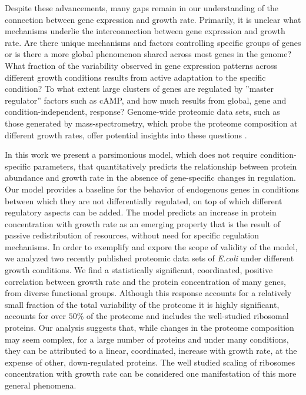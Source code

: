 \documentclass[a4paper]{article}
\begin{document}
Despite these advancements, many gaps remain in our understanding of the connection between gene expression and growth rate.
Primarily, it is unclear what mechanisms underlie the interconnection between gene expression and growth rate.
Are there unique mechanisms and factors controlling specific groups of genes or is there a more global phenomenon shared across most genes in the genome?
What fraction of the variability observed in gene expression patterns across different growth conditions results from active adaptation to the specific condition?
To what extent large clusters of genes are regulated by ''master regulator'' factors such as cAMP, and how much results from global, gene and condition-independent, response?
Genome-wide proteomic data sets, such as those generated by mass-spectrometry, which probe the proteome composition at different growth rates, offer potential insights into these questions \cite{Valgepea2013,Heinemann2015,Hui_2015,Peebo_2015}.

In this work we present a parsimonious model, which does not require condition-specific parameters, that quantitatively predicts the relationship between protein abundance and growth rate in the absence of gene-specific changes in regulation.
Our model provides a baseline for the behavior of endogenous genes in conditions between which they are not differentially regulated, on top of which different regulatory aspects can be added.
The model predicts an increase in protein concentration with growth rate as an emerging property that is the result of passive redistribution of resources, without need for specific regulation mechanisms.
In order to exemplify and expore the scope of validity of the model, we analyzed two recently published proteomic data sets of \emph{E.coli} under different growth conditions\cite{Peebo_2015,Heinemann2015}.
We find a statistically significant, coordinated, positive correlation between growth rate and the protein concentration of many genes, from diverse functional groups.
Although this response accounts for a relatively small fraction of the total variability of the proteome it is highly significant, accounts for over $50\%$ of the proteome and includes the well-studied ribosomal proteins.
Our analysis suggests that, while changes in the proteome composition may seem complex, for a large number of proteins and under many conditions, they can be attributed to a linear, coordinated, increase with growth rate, at the expense of other, down-regulated proteins.
The well studied scaling of ribosomes concentration with growth rate can be considered one manifestation of this more general phenomena.
\end{document}
